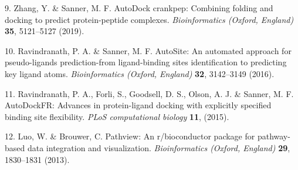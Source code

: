 \documentclass[
]{article}
\newenvironment{cslreferences}%
  {}%
  {\par}
\begin{document}
\begin{cslreferences}
\leavevmode\hypertarget{ref-AutodockCrankpZhang2019}{}%
9. Zhang, Y. \& Sanner, M. F. AutoDock crankpep: Combining folding and docking to predict protein-peptide complexes. \emph{Bioinformatics (Oxford, England)} \textbf{35}, 5121--5127 (2019).

\leavevmode\hypertarget{ref-AutositeAnAuRavind2016}{}%
10. Ravindranath, P. A. \& Sanner, M. F. AutoSite: An automated approach for pseudo-ligands prediction-from ligand-binding sites identification to predicting key ligand atoms. \emph{Bioinformatics (Oxford, England)} \textbf{32}, 3142--3149 (2016).

\leavevmode\hypertarget{ref-AutodockfrAdvRavind2015}{}%
11. Ravindranath, P. A., Forli, S., Goodsell, D. S., Olson, A. J. \& Sanner, M. F. AutoDockFR: Advances in protein-ligand docking with explicitly specified binding site flexibility. \emph{PLoS computational biology} \textbf{11}, (2015).

\leavevmode\hypertarget{ref-PathviewAnRLuoW2013}{}%
12. Luo, W. \& Brouwer, C. Pathview: An r/bioconductor package for pathway-based data integration and visualization. \emph{Bioinformatics (Oxford, England)} \textbf{29}, 1830--1831 (2013).
\end{cslreferences}
\end{document}
